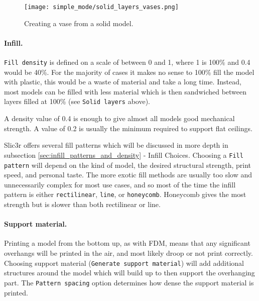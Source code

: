 \begin{figure}[H]
\centering
\texttt{[image: simple\_mode/solid\_layers\_vases.png]}
\caption{Creating a vase from a solid model.}
\label{fig:solid_layers_vases}
\end{figure}


\paragraph{Infill.} %
\label{par:simple_infill}
\texttt{Fill density} is defined on a scale of between 0 and 1, where 1 is 100\% and 0.4 would be 40\%.  For the majority of cases it makes no sense to 100\% fill the model with plastic, this would be a waste of material and take a long time.  Instead, most models can be filled with less material which is then sandwiched between layers filled at 100\% (see \texttt{Solid layers} above).

A density value of 0.4 is enough to give almost all models good mechanical strength.  A value of 0.2 is usually the minimum required to support flat ceilings.

Slic3r offers several fill patterns which will be discussed in more depth in subsection \ref{sec:infill_patterns_and_density} - Infill Choices.  Choosing a \texttt{Fill pattern} will depend on the kind of model, the desired structural  strength, print speed, and personal taste.  The more exotic fill methods are usually too slow and unnecessarily complex for most use cases, and so most of the time the infill pattern is either \texttt{rectilinear}, \texttt{line}, or \texttt{honeycomb}.  Honeycomb gives the most strength but is slower than both rectilinear or line.


\paragraph{Support material.} %
\label{par:simple_support_material}
Printing a model from the bottom up, as with FDM, means that any significant overhangs will be printed in the air, and most likely droop or not print correctly.  Choosing support material (\texttt{Generate support material}) will add additional structures around the model which will build up to then support the overhanging part.  The \texttt{Pattern spacing} option determines how dense the support material is printed.


